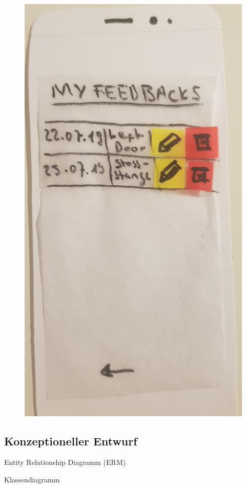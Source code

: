 \begin{figure}[H]
\begin{minipage}{.5\textwidth}
		\includegraphics[width=.8\linewidth]{resources/conception/lowfi_list.jpg}
		\label{fig:test2}
	\end{minipage}
\end{figure}

\subsection{Konzeptioneller Entwurf}




Entity Relationship Diagramm (ERM)


Klassendiagramm